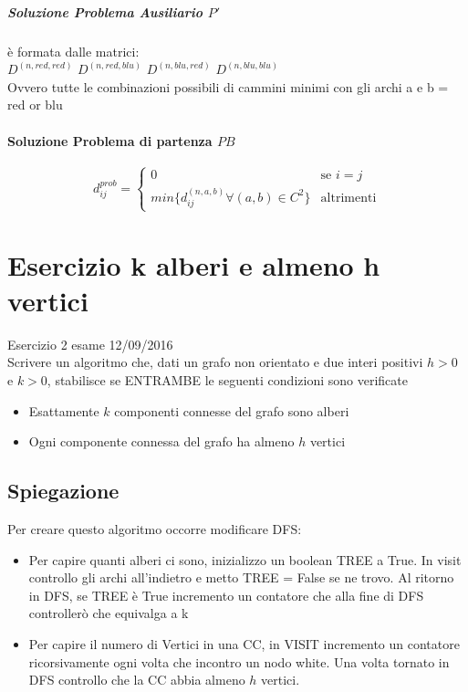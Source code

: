 \documentclass[12pt, a4paper, openany]{book}
\begin{document}
\subparagraph{Soluzione Problema Ausiliario $P'$} è formata dalle matrici:\\
$D^{(n,red,red)}$ $D^{(n,red,blu)}$ $D^{(n,blu,red)}$ $D^{(n,blu,blu)}$ \\
Ovvero tutte le combinazioni possibili di cammini minimi con gli archi a e b = red or blu

\paragraph{Soluzione Problema di partenza $PB$}
\begin{equation*}
	d^{prob}_{ij} = \begin{cases}
		0                                             & \text{se $i=j$}   \\
		min\{d^{(n,a,b)}_{ij} \forall (a,b) \in C^2\} & \text{altrimenti}
	\end{cases}
\end{equation*}

\section{Esercizio k alberi e almeno h vertici} Esercizio 2 esame 12/09/2016\\
Scrivere un algoritmo che, dati un grafo non orientato e due interi positivi $h>0$ e $k>0$, stabilisce se ENTRAMBE le seguenti condizioni sono verificate
\begin{itemize}
	\item Esattamente $k$ componenti connesse del grafo sono alberi
	\item Ogni componente connessa del grafo ha almeno $h$ vertici
\end{itemize}

\subsection*{Spiegazione}
Per creare questo algoritmo occorre modificare DFS:
\begin{itemize}
	\item Per capire quanti alberi ci sono, inizializzo un boolean TREE a True. In visit controllo gli archi all'indietro e metto TREE = False se ne trovo. Al ritorno in DFS, se TREE è True incremento un contatore che alla fine di DFS controllerò che equivalga a k
	\item Per capire il numero di Vertici in una CC, in VISIT incremento un contatore ricorsivamente ogni volta che incontro un nodo white. Una volta tornato in DFS controllo che la CC abbia almeno $h$ vertici.
\end{itemize}
\end{document}
